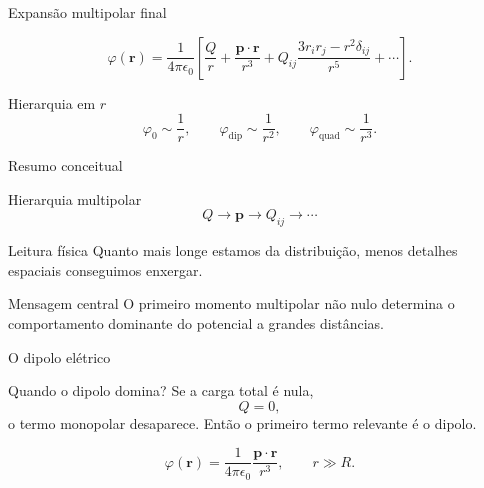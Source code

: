 \documentclass[aspectratio=169]{beamer}
\begin{document}
\begin{frame}{Expansão multipolar final}

\begin{eqbox}
\begin{equation}
\varphi(\mathbf r)
=
\frac{1}{4\pi\epsilon_0}
\left[
\frac{Q}{r}
+
\frac{\mathbf p\cdot\mathbf r}{r^3}
+
Q_{ij}
\frac{3r_i r_j-r^2\delta_{ij}}{r^5}
+\cdots
\right].
\tag{4.7}
\label{eq:expansao_multipolar}
\end{equation}
\end{eqbox}

\begin{mybox}{Hierarquia em \(r\)}
\[
\varphi_0\sim \frac{1}{r},
\qquad
\varphi_{\text{dip}}\sim \frac{1}{r^2},
\qquad
\varphi_{\text{quad}}\sim \frac{1}{r^3}.
\]
\end{mybox}

\end{frame}

\begin{frame}{Resumo conceitual}

\begin{mybox}{Hierarquia multipolar}
\[
Q
\longrightarrow
\mathbf p
\longrightarrow
Q_{ij}
\longrightarrow
\cdots
\]
\end{mybox}

\begin{mybox}{Leitura física}
Quanto mais longe estamos da distribuição, menos detalhes espaciais conseguimos enxergar.
\end{mybox}

\begin{mybox}{Mensagem central}
O primeiro momento multipolar não nulo determina o comportamento dominante do potencial a grandes distâncias.
\end{mybox}

\end{frame}
\begin{frame}{O dipolo elétrico}

\begin{mybox}{Quando o dipolo domina?}
Se a carga total é nula,
\[
Q=0,
\]
o termo monopolar desaparece. Então o primeiro termo relevante é o dipolo.
\end{mybox}

\begin{eqbox}
\begin{equation}
\varphi(\mathbf r)
=
\frac{1}{4\pi\epsilon_0}
\frac{\mathbf p\cdot\mathbf r}{r^3},
\qquad r\gg R.
\tag{4.8}
\label{eq:potencial_dipolo_2}
\end{equation}
\end{eqbox}

\end{frame}
\end{document}
